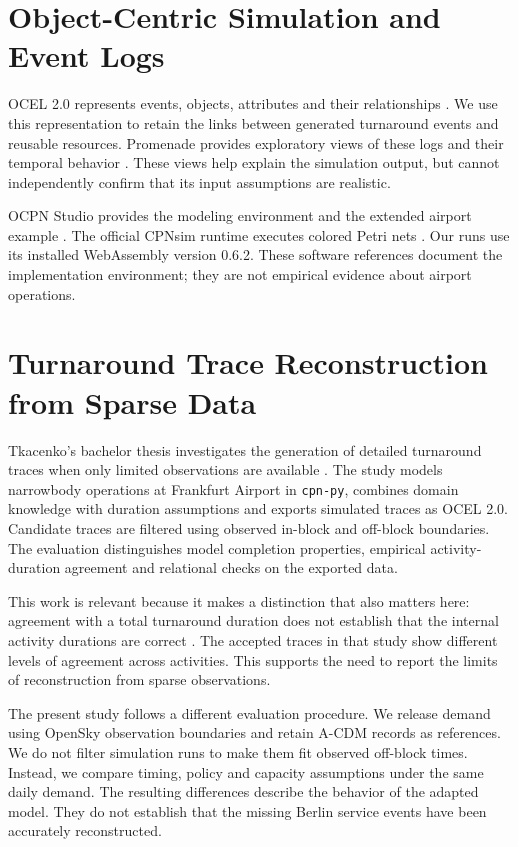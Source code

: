 \section{Object-Centric Simulation and Event Logs}
OCEL 2.0 represents events, objects, attributes and their relationships \cite{ocel2}. We use this representation to retain the links between generated turnaround events and reusable resources. Promenade provides exploratory views of these logs and their temporal behavior \cite{promenade}. These views help explain the simulation output, but cannot independently confirm that its input assumptions are realistic.

OCPN Studio provides the modeling environment and the extended airport example \cite{ocpn_studio}. The official CPNsim runtime executes colored Petri nets \cite{cpnsim}. Our runs use its installed WebAssembly version 0.6.2. These software references document the implementation environment; they are not empirical evidence about airport operations.

\section{Turnaround Trace Reconstruction from Sparse Data}
Tkacenko's bachelor thesis investigates the generation of detailed turnaround traces when only limited observations are available \cite{tkacenko2026}. The study models narrowbody operations at Frankfurt Airport in \texttt{cpn-py}, combines domain knowledge with duration assumptions and exports simulated traces as OCEL 2.0. Candidate traces are filtered using observed in-block and off-block boundaries. The evaluation distinguishes model completion properties, empirical activity-duration agreement and relational checks on the exported data.

This work is relevant because it makes a distinction that also matters here: agreement with a total turnaround duration does not establish that the internal activity durations are correct \cite[Sections~6.2 and~7.4]{tkacenko2026}. The accepted traces in that study show different levels of agreement across activities. This supports the need to report the limits of reconstruction from sparse observations.

The present study follows a different evaluation procedure. We release demand using OpenSky observation boundaries and retain A-CDM records as references. We do not filter simulation runs to make them fit observed off-block times. Instead, we compare timing, policy and capacity assumptions under the same daily demand. The resulting differences describe the behavior of the adapted model. They do not establish that the missing Berlin service events have been accurately reconstructed.

